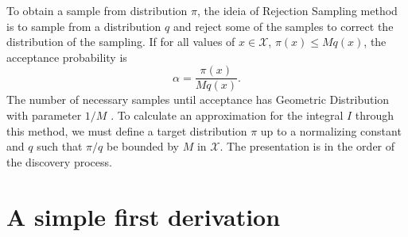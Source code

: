 \documentclass[a4paper,10pt, notitlepage]{report}
\begin{document}
To obtain a sample from distribution $\pi$, the ideia of Rejection Sampling
method is to sample from a distribution $q$ and reject some of the samples to
correct the distribution of the sampling. If for all values of $x \in
\mathcal{X}$, $\pi(x) \le Mq(x)$, the acceptance probability is 
$$
\alpha = \frac{\pi(x)}{Mq(x)}.
$$
The number of necessary samples until acceptance has Geometric Distribution
with parameter $1/M$ \cite[p. 51]{robert2004monte}. To calculate an
approximation for the integral $I$ through this method, we must define 
a target distribution $\pi$ up to a normalizing constant and $q$ such that
$\pi/q$ be bounded by $M$ in $\mathcal{X}$. The presentation is in the order 
of the discovery process. 

\section*{A simple first derivation}
\end{document}
